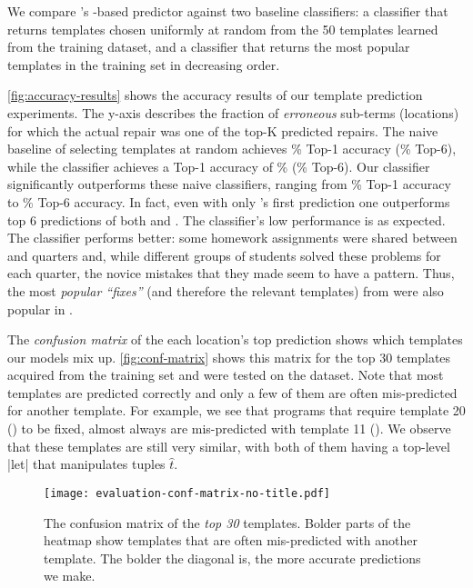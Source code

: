 %
We compare \toolname's \dnn-based predictor against two baseline classifiers: a
\random classifier that returns templates chosen uniformly at random from the 50
templates learned from the \SPRING training dataset, and a \popular classifier
that returns the most popular templates in the training set in decreasing order.



%
\autoref{fig:accuracy-results} shows the accuracy results of our template
prediction experiments. The y-axis describes the fraction of \emph{erroneous}
sub-terms (locations) for which the actual repair was one of the top-K predicted
repairs.
%
The naive baseline of selecting templates at random achieves \RandomTopOne\%
Top-1 accuracy (\RandomTopSix\% Top-6), while the \popular classifier achieves a
Top-1 accuracy of \PopularTopOne\% (\PopularTopSix\% Top-6).
%
Our \dnn classifier significantly outperforms these naive classifiers, ranging
from \DnnTopOne\% Top-1 accuracy to \DnnTopSix\% Top-6 accuracy.
%
In fact, even with only \dnn's first prediction one outperforms top 6
predictions of both \random and \popular.
%
The \random classifier's low performance is as expected.
%
The \popular classifier performs better: some homework assignments were shared
between \SPRING and \FALL quarters and, while different groups of students
solved these problems for each quarter, the novice mistakes that they made seem
to have a pattern. Thus, the most \emph{popular ``fixes''} (and therefore the
relevant templates) from \SPRING were also popular in \FALL.

%
The \emph{confusion matrix} of the each location's top prediction shows which
templates our models mix up.
%
\autoref{fig:conf-matrix} shows this matrix for the top 30 templates acquired
from the \SPRING training set and were tested on the \FALL dataset.
%
Note that most templates are predicted correctly and only a few of them are
often mis-predicted for another template.
%
For example, we see that programs that require template 20
() to be fixed,
almost always are mis-predicted with template 11 (). We observe that these templates are still very
similar, with both of them having a top-level |let| that manipulates tuples
$\hat{t}$.

\begin{figure}[t]
  \centering
  \texttt{[image: evaluation-conf-matrix-no-title.pdf]}
  \caption{The confusion matrix of the \emph{top 30} templates. Bolder parts of
  the heatmap show templates that are often mis-predicted with another template.
  The bolder the diagonal is, the more accurate predictions we make.}
  \label{fig:conf-matrix}
\end{figure}

